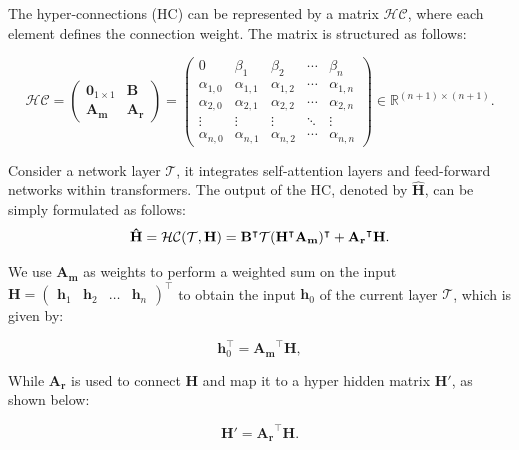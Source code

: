 \documentclass{article} %
\begin{document}
The hyper-connections (HC) can be represented by a matrix $\mathcal{HC}$, where each element defines the connection weight. The matrix is structured as follows:

\begin{equation}
\label{eq:shc}
\mathcal{HC}
 = \begin{pmatrix}
\mathbf{0}_{1\times1} & \mathbf{B} \\
\mathbf{A_m} & \mathbf{A_r}
\end{pmatrix}
= \begin{pmatrix}
0 & \beta_{1} & \beta_{2} & \cdots & \beta_{n} \\
\alpha_{1,0} & \alpha_{1,1} & \alpha_{1,2} & \cdots & \alpha_{1, n} \\
\alpha_{2,0} & \alpha_{2,1} & \alpha_{2,2} & \cdots & \alpha_{2, n} \\
\vdots & \vdots & \vdots & \ddots & \vdots \\
\alpha_{n,0} & \alpha_{n,1} & \alpha_{n,2} & \cdots & \alpha_{n, n}
\end{pmatrix} \in \mathbb{R}^{(n+1) \times (n+1)}.
\end{equation}

Consider a network layer $\mathcal{T}$, it integrates self-attention layers and feed-forward networks within transformers. The output of the HC, denoted by $\mathbf{\hat{H}}$, can be simply formulated as follows:
\begin{equation}
\mathbf{\hat{H}} = \mathcal{HC}(\mathcal{T}, \mathbf{H}) \\
=\mathbf{B}^\intercal\mathcal{T}(\mathbf{H}^\intercal\mathbf{A_m})^\intercal + \mathbf{A_r}^\intercal\mathbf{H}. \label{eq:hc_recurrent_form}
\end{equation}


We use $\mathbf{A_m}$ as weights to perform a weighted sum on the input $\mathbf H = \begin{pmatrix}\mathbf h_1 & \mathbf h_2 & \dots & \mathbf h_n\end{pmatrix}^\intercal$ to obtain the input $\mathbf{h}_0$ of the current layer $\mathcal{T}$, which is given by:

\begin{equation}
\mathbf{h}_0^\intercal = \mathbf{A_m}^\intercal \mathbf{H},
\end{equation}

While $\mathbf{A_r}$ is used to connect $\mathbf{H}$ and map it to a hyper hidden matrix $\mathbf{H'}$, as shown below:

\begin{equation}
\mathbf{H'} = \mathbf{A_r}^\intercal \mathbf{H}.
\end{equation}
\end{document}
